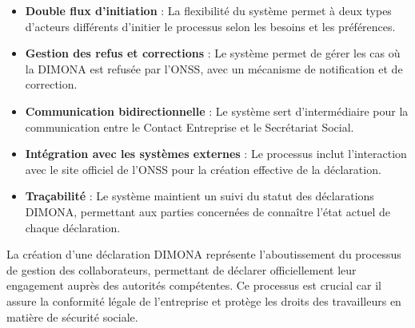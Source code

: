 \begin{itemize}[leftmargin=*,label=\textcolor{darkgray}{$\bullet$},itemsep=0.3em]
  \item \textbf{Double flux d'initiation} : La flexibilité du système permet à deux types d'acteurs différents d'initier le processus selon les besoins et les préférences.
  \item \textbf{Gestion des refus et corrections} : Le système permet de gérer les cas où la DIMONA est refusée par l'ONSS, avec un mécanisme de notification et de correction.
  \item \textbf{Communication bidirectionnelle} : Le système sert d'intermédiaire pour la communication entre le Contact Entreprise et le Secrétariat Social.
  \item \textbf{Intégration avec les systèmes externes} : Le processus inclut l'interaction avec le site officiel de l'ONSS pour la création effective de la déclaration.
  \item \textbf{Traçabilité} : Le système maintient un suivi du statut des déclarations DIMONA, permettant aux parties concernées de connaître l'état actuel de chaque déclaration.
\end{itemize}

\vspace{0.5cm}

\begin{tcolorbox}[
  title={\textbf{Importance des déclarations DIMONA}},
  colback=blue!5!white,
  colframe=primarycolor,
  fonttitle=\bfseries,
  boxrule=0.5mm,
  arc=2mm,
  left=6mm,
  right=6mm,
  top=6mm,
  bottom=6mm
]
La création d'une déclaration DIMONA représente l'aboutissement du processus de gestion des collaborateurs, permettant de déclarer officiellement leur engagement auprès des autorités compétentes. Ce processus est crucial car il assure la conformité légale de l'entreprise et protège les droits des travailleurs en matière de sécurité sociale.
\end{tcolorbox}



